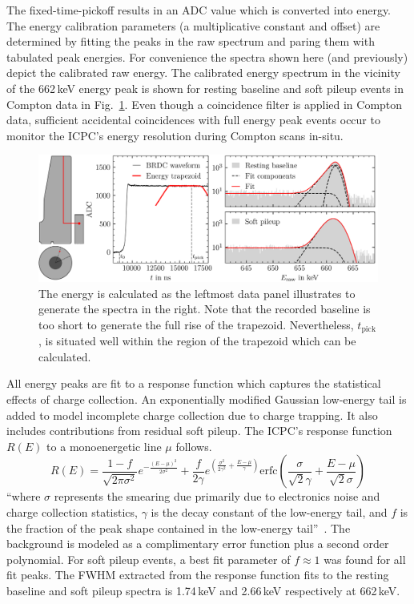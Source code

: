 The fixed-time-pickoff results in an ADC value which is converted into energy. The energy calibration parameters (a multiplicative constant and offset) are determined by fitting the peaks in the raw spectrum and paring them with tabulated peak energies. For convenience the spectra shown here (and previously) depict the calibrated raw energy. The calibrated energy spectrum in the vicinity of the 662\,keV \CsS{} energy peak is shown for resting baseline and soft pileup events in Compton data in Fig.~\ref{fig:Cs_energy_calculation}. Even though a coincidence filter is applied in Compton data, sufficient accidental coincidences with full energy peak events occur to monitor the ICPC's energy resolution during Compton scans in-situ. 
\begin{figure}[htb]
    \centering
    \includegraphics[width=6in]{figs/param/Cs_energy_calculation.png}
    \caption{The energy is calculated as the leftmost data panel illustrates to generate the spectra in the right. Note that the recorded baseline is too short to generate the full rise of the trapezoid. Nevertheless, $t_\text{pick}$, is situated well within the region of the trapezoid which can be calculated.}
    \label{fig:Cs_energy_calculation}
\end{figure}

All energy peaks are fit to a response function which captures the statistical effects of charge collection. An exponentially modified Gaussian low-energy tail is added to model incomplete charge collection due to charge trapping. It also includes contributions from residual soft pileup. The ICPC's response function $R(E)$ to a monoenergetic line $\mu$ follows. 
\begin{equation}
	R(E) = \frac{1-f}{\sqrt{2\pi\sigma^2}}e^{-\frac{(E-\mu)^2}{2\sigma^2}} + \frac{f}{2\gamma}e^{\left(\frac{\sigma^2}{2\gamma^2}+\frac{E-\mu}{\gamma}\right)}\text{erfc}\left(\frac{\sigma}{\sqrt{2}\gamma} + \frac{E-\mu}{\sqrt{2}\sigma}\right)
	\label{eq:energy_peak_fit}
\end{equation}
``where $\sigma$ represents the smearing due primarily due to electronics noise and charge collection statistics, $\gamma$ is the decay constant of the low-energy tail, and $f$ is the fraction of the peak shape contained in the low-energy tail''~\cite{MAJORANA2019}. The background is modeled as a complimentary error function plus a second order polynomial. For soft pileup events, a best fit parameter of $f \approx 1$ was found for all fit peaks. The FWHM extracted from the response function fits to the resting baseline and soft pileup spectra is 1.74\,keV and 2.66\,keV respectively at 662\,keV. 

